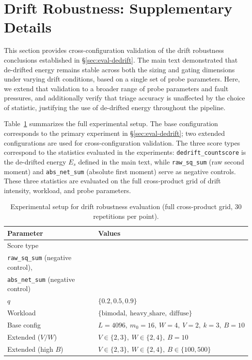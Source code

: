 \section{Drift Robustness: Supplementary Details}
\label{sec:appendix-dedrift}

This section provides cross-configuration validation of the drift robustness conclusions established in \S\ref{sec:eval-dedrift}. The main text demonstrated that de-drifted energy remains stable across both the sizing and gating dimensions under varying drift conditions, based on a single set of probe parameters. Here, we extend that validation to a broader range of probe parameters and fault pressures, and additionally verify that triage accuracy is unaffected by the choice of statistic, justifying the use of de-drifted energy throughout the pipeline.

Table~\ref{tab:c2-1} summarizes the full experimental setup. The base configuration corresponds to the primary experiment in \S\ref{sec:eval-dedrift}; two extended configurations are used for cross-configuration validation. The three score types correspond to the statistics evaluated in the experiments: \texttt{dedrift\_countscore} is the de-drifted energy $E_s$ defined in the main text, while \texttt{raw\_sq\_sum} (raw second moment) and \texttt{abs\_net\_sum} (absolute first moment) serve as negative controls. These three statistics are evaluated on the full cross-product grid of drift intensity, workload, and probe parameters.

\begin{table}[!htbp]
\centering
\small
\setlength{\tabcolsep}{3pt}
\begin{tabular}{@{}lp{}@{}}
\toprule
Parameter & Values \\
\midrule
Score type & \shortstack[l]{\texttt{dedrift\_countscore} (primary),\\ \texttt{raw\_sq\_sum} (negative control),  \\ \texttt{abs\_net\_sum} (negative control)} \\
$q$ & $\{0.2, 0.5, 0.9\}$ \\
Workload & $\{\text{bimodal},\ \text{heavy\_share},\ \text{diffuse}\}$ \\
\midrule
Base config & $L=4096,\ m_0=16,\ W=4,\ V=2,\ k=3,\ B=10$ \\
Extended ($V/W$) & $V \in \{2,3\},\ W \in \{2,4\},\ B=10$ \\
Extended (high $B$) & $V \in \{2,3\},\ W \in \{2,4\},\ B \in \{100, 500\}$ \\
\bottomrule
\end{tabular}
\caption{Experimental setup for drift robustness evaluation (full cross-product grid, 30 repetitions per point).}
\label{tab:c2-1}
\end{table}

